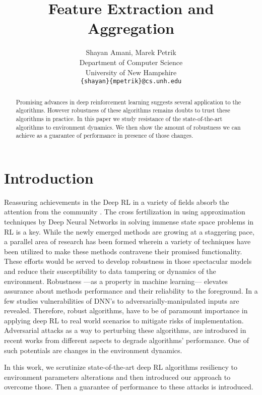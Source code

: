 \documentclass{article}
\title{Feature Extraction and Aggregation}
\author{%
  Shayan Amani, Marek Petrik \\ %
  Department of Computer Science\\
  University of New Hampshire \\
  \texttt{\{shayan\}\{mpetrik\}@cs.unh.edu} \\
}
\begin{document}
\maketitle

\begin{abstract}
  Promising advances in deep reinforcement learning suggests several application to the algorithms. However robustness of these algorithms remains doubts to trust these algorithms in practice. In this paper we study resistance of the state-of-the-art algorithms to environment dynamics. We then show the amount of robustness we can achieve as a guarantee of performance in presence of those changes.
\end{abstract}

\section{Introduction}


Reassuring achievements in the Deep RL in a variety of fields absorb the attention from the community \citep{Mnih2015, Schulman2015TrustOptimization, Lillicrap2015ContinuousDDPG, silver2016a}. The cross fertilization in using approximation techniques by Deep Neural Networks in solving immense state space problems in RL is a key. While the newly emerged methods are growing at a staggering pace, a parallel area of research has been formed wherein a variety of techniques have been utilized to make these methods contravene their promised functionality. These efforts would be served to develop robustness in those spectacular models and reduce their susceptibility to data tampering or dynamics of the environment. Robustness ---as a property in machine learning--- elevates assurance about methods performance and their reliability to the foreground. In a few studies \cite{Goodfellow2014}  vulnerabilities of DNN's to adversarially-manipulated inputs are revealed. Therefore, robust algorithms, have to be of paramount importance in applying deep RL to real world scenarios to mitigate risks of implementation. Adversarial attacks as a way to perturbing these algorithms, are introduced in recent works \cite{Huang2017, Kos2017} from different aspects to degrade algorithms' performance. One of such potentials are changes in the environment dynamics.

In this work, we scrutinize state-of-the-art deep RL algorithms resiliency to environment parameters alterations and then introduced our approach to overcome those. Then a guarantee of performance to these attacks is introduced.
\end{document}
